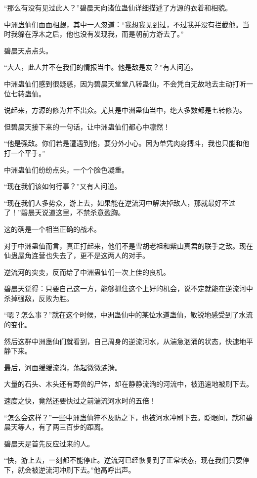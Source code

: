 \begin{this_body}
“那么有没有见过此人？”碧晨天向诸位蛊仙详细描述了方源的衣着和相貌。

中洲蛊仙们面面相觑，其中一人忽道：“我想我见到过，不过我并没有拦截他。当时我躲在浮木之后，他也没有发现我，而是朝前方游去了。”

碧晨天点点头。

“大人，此人并不在我们的情报当中。他是敌是友？”有人问道。

中洲蛊仙们感到很疑惑，因为碧晨天堂堂八转蛊仙，不会凭白无故地去主动打听一位七转蛊仙。

说起来，方源的修为并不出众。尤其是中洲蛊仙当中，绝大多数都是七转修为。

但碧晨天接下来的一句话，让中洲蛊仙们都心中凛然！

“他是强敌。你们若是遭遇到他，要分外小心。因为单凭肉身搏斗，我也只能和他打一个平手。”

中洲蛊仙们纷纷点头，一个个脸色凝重。

“现在我们该如何行事？”又有人问道。

“现在我们人多势众，游上去，如果能在逆流河中解决掉敌人，那就最好不过了！”碧晨天说道这里，不禁杀意盈胸。

这的确是一个相当正确的战术。

对于中洲蛊仙而言，真正打起来，他们不是雪胡老祖和紫山真君的联手之敌。现在仙蛊屋角连营也失去了，更不是这两人的对手。

逆流河的突变，反而给了中洲蛊仙们一次上佳的良机。

碧晨天觉得：只要自己这一方，能够抓住这个上好的机会，说不定就能在逆流河中杀掉强敌，反败为胜。

“嗯？怎么事？”就在这个时候，中洲蛊仙中的某位水道蛊仙，敏锐地感受到了水流的变化。

然后这群中洲蛊仙们就看到，自己周身的逆流河水，从湍急汹涌的状态，快速地平静下来。

最后，河面缓缓流淌，荡起微微涟漪。

大量的石头、木头还有野兽的尸体，却在静静流淌的河流中，被迅速地被刷下去。

速度之快，竟然还要快过之前湍流河水时的五倍！

“怎么会这样？”一些中洲蛊仙猝不及防之下，也被河水冲刷下去。眨眼间，就和碧晨天等人，有了两三百步的距离。

碧晨天是首先反应过来的人。

“快，游上去，一刻都不能停止。逆流河已经恢复到了正常状态，现在我们只要停下，就会被逆流河冲刷下去。”他高呼出声。


\end{this_body}
